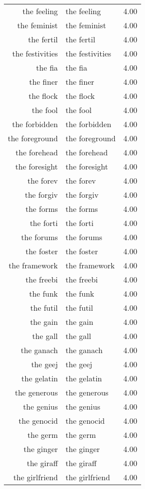 \begin{table}[ht]
\begin{tabular}{rlr}
  the feeling & the feeling & 4.00 \\ 
  the feminist & the feminist & 4.00 \\ 
  the fertil & the fertil & 4.00 \\ 
  the festivities & the festivities & 4.00 \\ 
  the fia & the fia & 4.00 \\ 
  the finer & the finer & 4.00 \\ 
  the flock & the flock & 4.00 \\ 
  the fool & the fool & 4.00 \\ 
  the forbidden & the forbidden & 4.00 \\ 
  the foreground & the foreground & 4.00 \\ 
  the forehead & the forehead & 4.00 \\ 
  the foresight & the foresight & 4.00 \\ 
  the forev & the forev & 4.00 \\ 
  the forgiv & the forgiv & 4.00 \\ 
  the forms & the forms & 4.00 \\ 
  the forti & the forti & 4.00 \\ 
  the forums & the forums & 4.00 \\ 
  the foster & the foster & 4.00 \\ 
  the framework & the framework & 4.00 \\ 
  the freebi & the freebi & 4.00 \\ 
  the funk & the funk & 4.00 \\ 
  the futil & the futil & 4.00 \\ 
  the gain & the gain & 4.00 \\ 
  the gall & the gall & 4.00 \\ 
  the ganach & the ganach & 4.00 \\ 
  the geej & the geej & 4.00 \\ 
  the gelatin & the gelatin & 4.00 \\ 
  the generous & the generous & 4.00 \\ 
  the genius & the genius & 4.00 \\ 
  the genocid & the genocid & 4.00 \\ 
  the germ & the germ & 4.00 \\ 
  the ginger & the ginger & 4.00 \\ 
  the giraff & the giraff & 4.00 \\ 
  the girlfriend & the girlfriend & 4.00 \\ 

\end{tabular}
\end{table}
